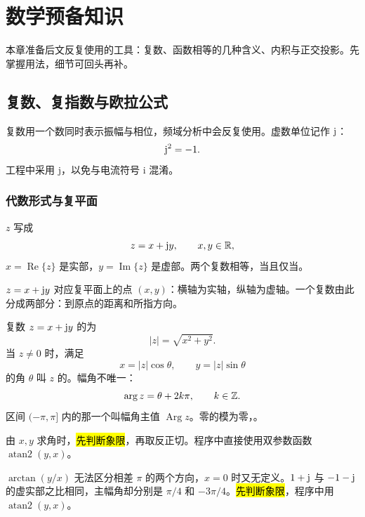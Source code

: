 \chapter{数学预备知识}
\label{chap:math-foundations}

本章准备后文反复使用的工具：复数、函数相等的几种含义、内积与正交投影。先掌握用法，细节可回头再补。

\section{复数、复指数与欧拉公式}
\label{sec:complex-numbers}

复数用一个数同时表示振幅与相位，频域分析中会反复使用。虚数单位记作 $\mathrm{j}$：
\[
  \mathrm{j}^2=-1.
\]
工程中采用 $\mathrm{j}$，以免与电流符号 $\mathrm{i}$ 混淆。

\subsection{代数形式与复平面}

\begin{definition}[复数的代数形式]
   $z$ 写成
  \[
    z=x+\mathrm{j} y, \qquad x,y\in\mathbb{R},
  \]
  $x=\operatorname{Re}\{z\}$ 是实部，$y=\operatorname{Im}\{z\}$ 是虚部。两个复数相等，当且仅当。
\end{definition}

$z=x+\mathrm{j} y$ 对应复平面上的点 $(x,y)$：横轴为实轴，纵轴为虚轴。一个复数由此分成两部分：到原点的距离和所指方向。

\begin{definition}[模与幅角]
  复数 $z=x+\mathrm{j} y$ 的为
  \begin{equation}
    |z|=\sqrt{x^2+y^2}.
    \label{eq:complex-magnitude}
  \end{equation}
  当 $z\ne 0$ 时，满足
  \[
    x=|z|\cos\theta,\qquad y=|z|\sin\theta
  \]
  的角 $\theta$ 叫 $z$ 的。幅角不唯一：
  \[
    \arg z=\theta+2k\pi,\qquad k\in\mathbb{Z}.
  \]
  区间 $(-\pi,\pi]$ 内的那一个叫幅角主值 $\operatorname{Arg}z$。零的模为零，。
\end{definition}

由 $x,y$ 求角时，\hl{先判断象限}，再取反正切。程序中直接使用双参数函数 $\operatorname{atan2}(y,x)$。

\begin{pitfall}[只用反正切求幅角]
  $\arctan(y/x)$ 无法区分相差 $\pi$ 的两个方向，$x=0$ 时又无定义。$1+\mathrm{j}$ 与 $-1-\mathrm{j}$ 的虚实部之比相同，主幅角却分别是 $\pi/4$ 和 $-3\pi/4$。\hl{先判断象限}，程序中用 $\operatorname{atan2}(y,x)$。
\end{pitfall}

